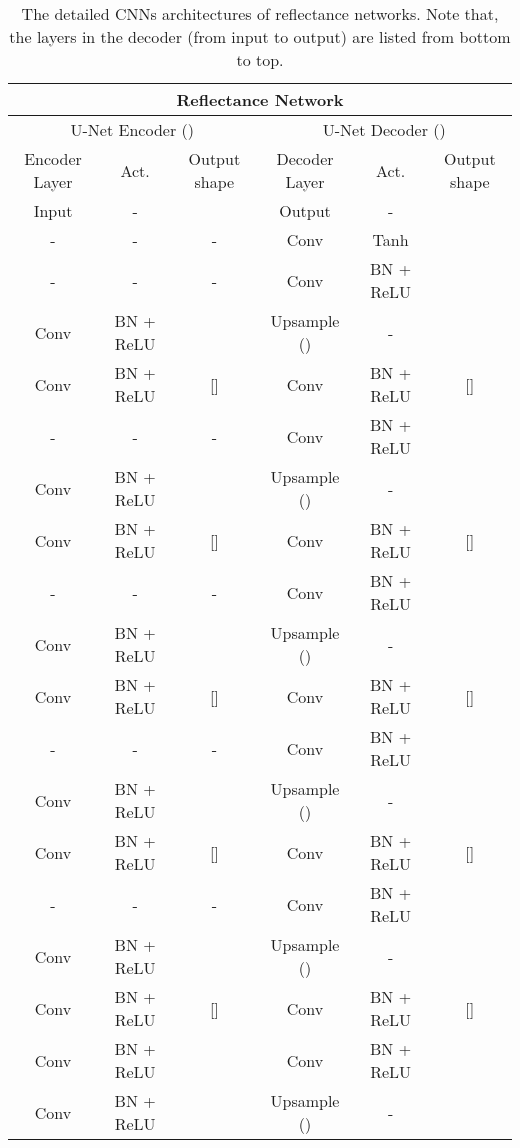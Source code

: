 \begin{appendix}
\begin{table}[ht]
	\centering
	\footnotesize
	\setlength{\abovecaptionskip}{3pt}
    \setlength{\belowcaptionskip}{-5pt}
	\newcommand{\tabincell}[2]{\begin{tabular}{@{}#1@{}}#2\end{tabular}}
	\begin{tabular}{c|c|c|c|c|c}
		\hline 
		\multicolumn{6}{c}{Reflectance Network} \\
		\hline
		\multicolumn{3}{c|}{U-Net Encoder ()} & \multicolumn{3}{c}{U-Net Decoder ()} \\
		\hline
		Encoder Layer & Act. & Output shape & Decoder Layer & Act. & Output shape \\ \hline
		Input & - &  & Output & - &  \\
		- & - & - & Conv  & Tanh &  \\
		- & - & - & Conv  & BN + ReLU &  \\
		Conv  & BN + ReLU &  & Upsample () & - &  \\
		Conv  & BN + ReLU & [] & Conv  & BN + ReLU & [] \\
    	- & - & - & Conv  & BN + ReLU &  \\
    	Conv  & BN + ReLU &  & Upsample () & - &  \\
    	Conv  & BN + ReLU & [] & Conv  & BN + ReLU & [] \\
    	- & - & - & Conv  & BN + ReLU &  \\ 
    	Conv  & BN + ReLU &  & Upsample () & - &  \\ 
    	Conv  & BN + ReLU & [] & Conv  & BN + ReLU & [] \\
    	- & - & - & Conv  & BN + ReLU &  \\ 
    	Conv  & BN + ReLU &  & Upsample () & - &  \\ 
    	Conv  & BN + ReLU & [] & Conv  & BN + ReLU & [] \\
    	- & - & - & Conv  & BN + ReLU &  \\ 
    	Conv  & BN + ReLU &  & Upsample () & - &  \\ 
    	Conv  & BN + ReLU & [] & Conv  & BN + ReLU & [] \\
    	Conv  & BN + ReLU &  & Conv  & BN + ReLU &  \\ 
    	Conv  & BN + ReLU &  & Upsample () & - &  \\
    	\hline
	\end{tabular}
	\renewcommand{\captionlabelfont}{\footnotesize}
	\caption{\footnotesize The detailed CNNs architectures of reflectance networks. Note that, the layers in the decoder (from input to output) are listed from bottom to top.}\label{reflectance}
\end{table}



\end{appendix}
